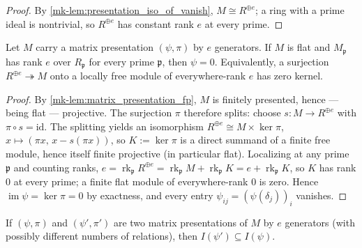 \begin{proof}
  \leanok
  By \ref{mk-lem:presentation_iso_of_vanish}, \(M \cong R^{\oplus e}\); a ring
  with a prime ideal is nontrivial, so \(R^{\oplus e}\) has constant rank
  \(e\) at every prime.
\end{proof}

\begin{theorem}
  \label{mk-thm:entry_ideal_flat_vanish}
  \leanok

  Let \(M\) carry a matrix presentation \((\psi, \pi)\) by \(e\) generators.
  If \(M\) is flat and \(M_{\mathfrak p}\) has rank \(e\) over
  \(R_{\mathfrak p}\) for every prime \(\mathfrak p\), then \(\psi = 0\).
  Equivalently, a surjection \(R^{\oplus e} \twoheadrightarrow M\) onto a
  locally free module of everywhere-rank \(e\) has zero kernel.
\end{theorem}

\begin{proof}
  \leanok
  By \ref{mk-lem:matrix_presentation_fp}, \(M\) is finitely presented, hence
  --- being flat --- projective.  The surjection \(\pi\) therefore splits:
  choose \(s : M \to R^{\oplus e}\) with \(\pi \circ s = \mathrm{id}\).
  The splitting yields an isomorphism
  \(R^{\oplus e} \cong M \times \ker \pi\), \(x \mapsto
  (\pi x,\, x - s(\pi x))\), so \(K := \ker \pi\) is a direct summand of a
  finite free module, hence itself finite projective (in particular flat).
  Localizing at any prime \(\mathfrak p\) and counting ranks,
  \(e = \operatorname{rk}_{\mathfrak p} R^{\oplus e}
     = \operatorname{rk}_{\mathfrak p} M + \operatorname{rk}_{\mathfrak p} K
     = e + \operatorname{rk}_{\mathfrak p} K\),
  so \(K\) has rank \(0\) at every prime; a finite flat module of
  everywhere-rank \(0\) is zero.  Hence
  \(\operatorname{im} \psi = \ker \pi = 0\) by exactness, and every entry
  \(\psi_{ij} = (\psi(\delta_j))_i\) vanishes.
\end{proof}

\begin{lemma}
  \label{mk-lem:entry_ideal_le}
  \leanok

  If \((\psi, \pi)\) and \((\psi', \pi')\) are two matrix presentations of
  \(M\) by \(e\) generators (with possibly different numbers of relations),
  then \(I(\psi') \subseteq I(\psi)\).
\end{lemma}

